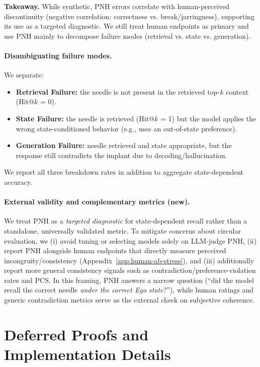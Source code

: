 \documentclass{article}
\begin{document}
\noindent\textbf{Takeaway.}
While synthetic, PNH errors correlate with human-perceived discontinuity (negative correlation: correctness vs. break/jarringness), supporting its use as a targeted diagnostic.
We still treat human endpoints as primary and use PNH mainly to decompose failure modes (retrieval vs. state vs. generation).

\paragraph{Disambiguating failure modes.}
We separate:
\begin{itemize}
  \item \textbf{Retrieval Failure:} the needle is not present in the retrieved top-$k$ context (Hit@$k$ = 0).
  \item \textbf{State Failure:} the needle is retrieved (Hit@$k$ = 1) but the model applies the wrong state-conditioned behavior (e.g., uses an out-of-state preference).
  \item \textbf{Generation Failure:} needle retrieved and state appropriate, but the response still contradicts the implant due to decoding/hallucination.
\end{itemize}
We report all three breakdown rates in addition to aggregate state-dependent accuracy.

\paragraph{External validity and complementary metrics (new).}
We treat PNH as a \emph{targeted diagnostic} for state-dependent recall rather than a standalone, universally validated metric.
To mitigate concerns about circular evaluation, we (i) avoid tuning or selecting models solely on LLM-judge PNH, (ii) report PNH alongside human endpoints that directly measure perceived incongruity/consistency (Appendix~\ref{app:human-ab-stress}), and (iii) additionally report more general consistency signals such as contradiction/preference-violation rates and PCS.
In this framing, PNH answers a narrow question (``did the model recall the correct needle \emph{under the correct Ego state}?''), while human ratings and generic contradiction metrics serve as the external check on subjective coherence.

\section{Deferred Proofs and Implementation Details}
\label{app:deferred-proofs}
\end{document}
